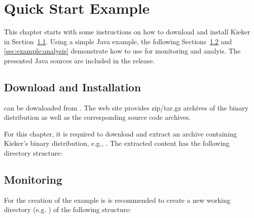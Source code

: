 \chapter{Quick Start Example}
This chapter starts with some instructions on how to download and install Kieker %
in Section~\ref{sec:example:downloadInstall}. %
Using a simple Java example, the following Sections~\ref{sec:example:monitoring} %
and \ref{sec:example:analysis} demonstrate how to use \Kieker{} for monitoring %
and analyis. %
\notify The presented Java sources are included in the \Kieker{} release.

\section{Download and Installation}\label{sec:example:downloadInstall}

\Kieker{} can be downloaded from \KiekerURL. The web %
site provides zip/tar.gz archives of the \Kieker{} binary distribution as well %
as the corresponding \Kieker{} source code archives.

For this chapter, it is required to download and extract an archive containing %
Kieker's binary distribution, e.g., .
The extracted content has the following directory structure:


\renewcommand*\DTstylecomment{\small\it\sffamily}
\renewcommand*\DTstyle{\small\ttfamily}

\vspace{1ex}



\section{Monitoring}\label{sec:example:monitoring}
For the creation of the example is is recommended to create a new working directory %
(e.g. ) of the following structure:

